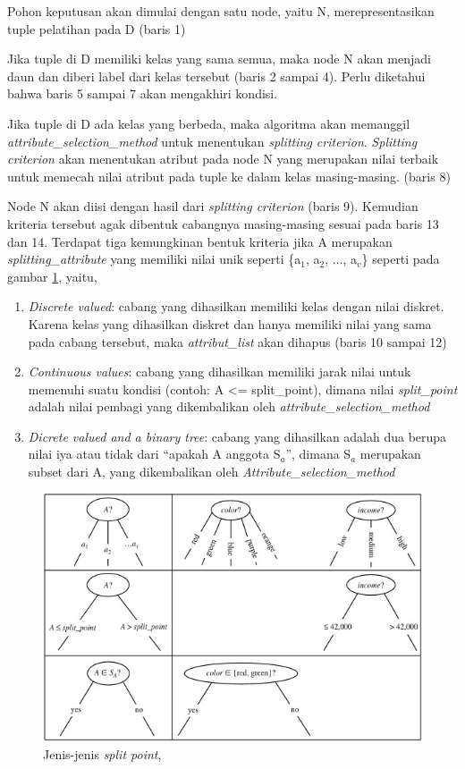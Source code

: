 Pohon keputusan akan dimulai dengan satu node, yaitu N, merepresentasikan tuple pelatihan pada D (baris 1)

Jika tuple di D memiliki kelas yang sama semua, maka node N akan menjadi daun dan diberi label dari kelas tersebut (baris 2 sampai 4). Perlu diketahui bahwa baris 5 sampai 7 akan mengakhiri kondisi.

Jika tuple di D ada kelas yang berbeda, maka algoritma akan memanggil \textsl{attribute\_selection\_method} untuk menentukan \textsl{splitting criterion}. \textsl{Splitting criterion} akan menentukan atribut pada node N yang merupakan nilai terbaik untuk memecah nilai atribut pada tuple ke dalam kelas masing-masing. (baris 8)

Node N akan diisi dengan hasil dari \textsl{splitting criterion} (baris 9). Kemudian kriteria tersebut agak dibentuk cabangnya masing-masing sesuai pada baris 13 dan 14. Terdapat tiga kemungkinan bentuk kriteria jika A merupakan \textsl{splitting\_attribute} yang memiliki nilai unik seperti \{a$_{1}$, a$_{2}$, ..., a$_{v}$\} seperti pada gambar \ref{fig:splitPoint}, yaitu,

\begin{enumerate}
	\item \textsl{Discrete valued}: cabang yang dihasilkan memiliki kelas dengan nilai diskret. Karena kelas yang dihasilkan diskret dan hanya memiliki nilai yang sama pada cabang tersebut, maka \textsl{attribut\_list} akan dihapus (baris 10 sampai 12)
	\item \textsl{Continuous values}: cabang yang dihasilkan memiliki jarak nilai untuk memenuhi suatu kondisi (contoh: A <= split\_point), dimana nilai \textsl{split\_point} adalah nilai pembagi yang dikembalikan oleh \textsl{attribute\_selection\_method}
	\item \textsl{Dicrete valued and a binary tree}: cabang yang dihasilkan adalah dua berupa nilai iya atau tidak dari "`apakah A anggota S$_{a}$"', dimana S$_{a}$ merupakan subset dari A, yang dikembalikan oleh \textsl{Attribute\_selection\_method}
\end{enumerate}


\begin{figure}
\includegraphics[scale=1]{Gambar/jenishasilsplitpoint.jpg}
\caption[Jenis-jenis \textsl{split point}]{Jenis-jenis \textsl{split point}, \cite{DM}} 
\label{fig:splitPoint}
\end{figure}

